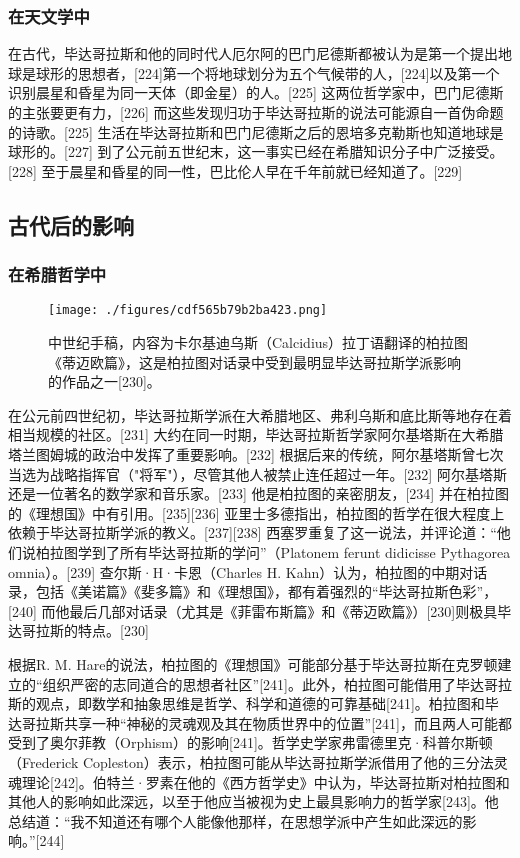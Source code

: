 \subsubsection{在天文学中}
在古代，毕达哥拉斯和他的同时代人厄尔阿的巴门尼德斯都被认为是第一个提出地球是球形的思想者，[224]第一个将地球划分为五个气候带的人，[224]以及第一个识别晨星和昏星为同一天体（即金星）的人。[225] 这两位哲学家中，巴门尼德斯的主张要更有力，[226] 而这些发现归功于毕达哥拉斯的说法可能源自一首伪命题的诗歌。[225] 生活在毕达哥拉斯和巴门尼德斯之后的恩培多克勒斯也知道地球是球形的。[227] 到了公元前五世纪末，这一事实已经在希腊知识分子中广泛接受。[228] 至于晨星和昏星的同一性，巴比伦人早在千年前就已经知道了。[229]
\subsection{古代后的影响}  
\subsubsection{在希腊哲学中}
\begin{figure}[ht]
\centering
\texttt{[image: ./figures/cdf565b79b2ba423.png]}
\caption{中世纪手稿，内容为卡尔基迪乌斯（Calcidius）拉丁语翻译的柏拉图《蒂迈欧篇》，这是柏拉图对话录中受到最明显毕达哥拉斯学派影响的作品之一[230]。} \label{fig_Pythag_14}
\end{figure}
在公元前四世纪初，毕达哥拉斯学派在大希腊地区、弗利乌斯和底比斯等地存在着相当规模的社区。[231] 大约在同一时期，毕达哥拉斯哲学家阿尔基塔斯在大希腊塔兰图姆城的政治中发挥了重要影响。[232] 根据后来的传统，阿尔基塔斯曾七次当选为战略指挥官（"将军"），尽管其他人被禁止连任超过一年。[232] 阿尔基塔斯还是一位著名的数学家和音乐家。[233] 他是柏拉图的亲密朋友，[234] 并在柏拉图的《理想国》中有引用。[235][236] 亚里士多德指出，柏拉图的哲学在很大程度上依赖于毕达哥拉斯学派的教义。[237][238] 西塞罗重复了这一说法，并评论道：“他们说柏拉图学到了所有毕达哥拉斯的学问”（Platonem ferunt didicisse Pythagorea omnia）。[239] 查尔斯·H·卡恩（Charles H. Kahn）认为，柏拉图的中期对话录，包括《美诺篇》《斐多篇》和《理想国》，都有着强烈的“毕达哥拉斯色彩”，[240] 而他最后几部对话录（尤其是《菲雷布斯篇》和《蒂迈欧篇》）[230]则极具毕达哥拉斯的特点。[230]

根据R. M. Hare的说法，柏拉图的《理想国》可能部分基于毕达哥拉斯在克罗顿建立的“组织严密的志同道合的思想者社区”[241]。此外，柏拉图可能借用了毕达哥拉斯的观点，即数学和抽象思维是哲学、科学和道德的可靠基础[241]。柏拉图和毕达哥拉斯共享一种“神秘的灵魂观及其在物质世界中的位置”[241]，而且两人可能都受到了奥尔菲教（Orphism）的影响[241]。哲学史学家弗雷德里克·科普尔斯顿（Frederick Copleston）表示，柏拉图可能从毕达哥拉斯学派借用了他的三分法灵魂理论[242]。伯特兰·罗素在他的《西方哲学史》中认为，毕达哥拉斯对柏拉图和其他人的影响如此深远，以至于他应当被视为史上最具影响力的哲学家[243]。他总结道：“我不知道还有哪个人能像他那样，在思想学派中产生如此深远的影响。”[244]

